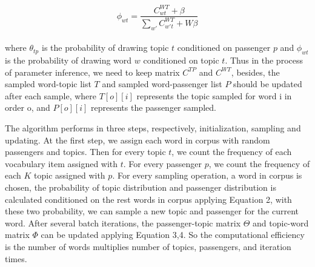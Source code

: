 \documentclass{sig-alternate-05-2015}
\begin{document}
\begin{equation}
\phi_{wt} = \frac{C_{wt}^{WT}+\beta}{\sum_{w'}C_{w't}^{WT}+W\beta}
\end{equation}\\
where $\theta_{tp}$ is the probability of drawing topic $t$ conditioned on passenger $p$ and $\phi_{wt}$ is the probability of drawing word $w$ conditioned on topic $t$. Thus in the process of parameter inference, we need to keep matrix $C^{TP}$ and $C^{WT}$, besides, the sampled word-topic list $T$ and sampled word-passenger list $P$ should be updated after each sample, where $T[o][i]$ represents the topic sampled for word i in order o, and $P[o][i]$ represents the passenger sampled.\par
The algorithm performs in three steps, respectively, initialization, sampling and updating. At the first step, we assign each word in corpus with random passengers and topics. Then for every topic $t$, we count the frequency of each vocabulary item assigned with $t$. For every passenger $p$, we count the frequency of each $K$ topic assigned with $p$. For every sampling operation, a word in corpus is chosen, the probability of topic distribution and passenger distribution is calculated conditioned on the rest words in corpus applying Equation 2, with these two probability, we can sample a new topic and passenger for the current word. After several batch iterations, the passenger-topic matrix $\Theta$ and topic-word matrix $\Phi$ can be updated applying Equation 3,4. So the computational efficiency is the number of words multiplies number of topics, passengers, and iteration times.\par
\end{document}
